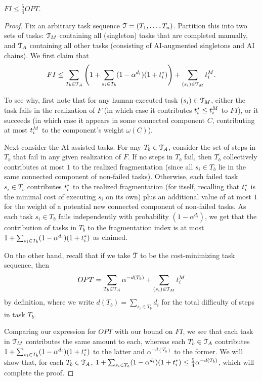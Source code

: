 \begin{lem}
\label{lem:FI.upper.bound}
    $FI \leq \tfrac{5}{4}OPT$.
\end{lem}
\begin{proof}
Fix an arbitrary task sequence $\mathcal{T} = (T_1, \dotsc, T_n)$.
Partition this into two sets of tasks: $\mathcal{T}_{M}$ containing all (singleton) tasks that are completed manually, and $\mathcal{T}_{A}$ containing all other tasks (consisting of AI-augmented singletons and AI chains).
We first claim that
\[ FI \leq \sum_{T_b \in \mathcal{T}_{A}}\left(1 + \sum_{s_i \in T_b}(1-\alpha^{d_i})(1+t^*_{i})\right) + \sum_{(s_i) \in \mathcal{T}_{M}}t^{M}_{i}. \]

To see why, first note that for any human-executed task $(s_i) \in \mathcal{T}_{M}$, either the task fails in the realization of $F$ (in which case it contributes $t^*_{i} \leq t^{M}_{i}$ to $FI$), or it succeeds (in which case it appears in some connected component $C$, contributing at most $t^{M}_{i}$ to the component's weight $\omega(C)$).

Next consider the AI-assisted tasks.
For any $T_b \in \mathcal{T}_{A}$, consider the set of steps in $T_b$ that fail in any given realization of $F$.
If no steps in $T_b$ fail, then $T_b$ collectively contributes at most $1$ to the realized fragmentation (since all $s_i \in T_b$ lie in the same connected component of non-failed tasks).
Otherwise, each failed task $s_i \in T_b$ contributes $t^*_{i}$ to the realized fragmentation (for itself, recalling that $t^*_{i}$ is the minimal cost of executing $s_i$ on its own) plus an additional value of at most $1$ for the weight of a potential new connected component of non-failed tasks.
As each task $s_i \in T_b$ fails independently with probability $(1-\alpha^{d_i})$, we get that the contribution of tasks in $T_b$ to the fragmentation index is at most $1 + \sum_{s_i \in T_b}(1-\alpha^{d_i})(1+t^*_{i})$ as claimed.

On the other hand, recall that if we take $\mathcal{T}$ to be the cost-minimizing task sequence, then
\[ OPT = \sum_{T_b \in \mathcal{T}_{A}} \alpha^{-d(T_b)} + \sum_{(s_i) \in \mathcal{T}_{M}} t^{M}_{i} \]
by definition, where we write $d(T_b) = \sum_{s_i \in T_b}d_i$ for the total difficulty of steps in task $T_b$.

Comparing our expression for $OPT$ with our bound on $FI$, we see that each task in $\mathcal{T}_{M}$ contributes the same amount to each, whereas each $T_b \in \mathcal{T}_{A}$ contributes $1+\sum_{s_i \in T_b}(1-\alpha^{d_i})(1+t^*_{i})$ to the latter and $\alpha^{-d(T_b)}$ to the former.
We will show that, for each $T_b \in \mathcal{T}_{A}$, $1 + \sum_{s_i \in T_b}(1-\alpha^{d_i})(1+t^*_{i}) \leq \frac{5}{4} \alpha^{-d(T_b)}$, which will complete the proof.


\end{proof}
